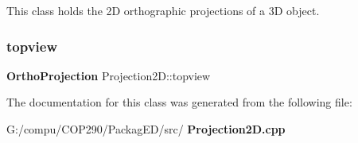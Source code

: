 This class holds the 2D orthographic projections of a 3D object. \mbox{\label{class_projection2_d_a90079954379a766f60ba01ad393327ab}} 
\subsubsection{topview}
{\footnotesize\ttfamily \textbf{ Ortho\+Projection} Projection2\+D\+::topview}



The documentation for this class was generated from the following file\+:\begin{DoxyCompactItemize}
\item 
G\+:/compu/\+C\+O\+P290/\+Packag\+E\+D/src/\textbf{ Projection2\+D.\+cpp}\end{DoxyCompactItemize}
